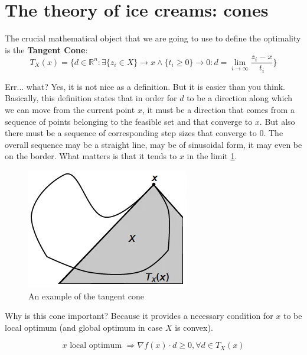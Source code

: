 \section{The theory of ice creams: cones}
\par The crucial mathematical object that we are going to use to define the optimality is the \textbf{Tangent Cone}:
\begin{equation}
    T_X(x) = \Big\{d \in \mathbb{R}^n : \exists \{z_i \in X\} \rightarrow x \wedge \{t_i \geq 0\} \rightarrow 0 : d = \lim_{i \rightarrow \infty} \frac{z_i-x}{t_i}\Big\}
\end{equation}
\par Err... what? Yes, it is not nice as a definition. But it is easier than you think. Basically, this definition states that in order for $d$ to be a direction along which we can move from the current point $x$, it must be a direction that comes from a sequence of points belonging to the feasible set and that converge to $x$. But also there must be a sequence of corresponding step sizes that converge to 0. The overall sequence may be a straight line, may be of sinusoidal form, it may even be on the border. What matters is that it tends to $x$ in the limit \ref{fig:chapter3-tangent_cone}.
\begin{figure}
    \centering
    \includegraphics[scale=0.5]{figures/3/chapter3-tangent_cone.png}
    \caption{An example of the tangent cone}
    \label{fig:chapter3-tangent_cone}
\end{figure}
\par Why is this cone important? Because it provides a necessary condition for $x$ to be local optimum (and global optimum in case $X$ is convex).
\begin{theorem}
    \[x \mbox{ local optimum } \Rightarrow \nabla f(x) \cdot d \geq 0, \forall d \in T_X(x)\]
\end{theorem}
